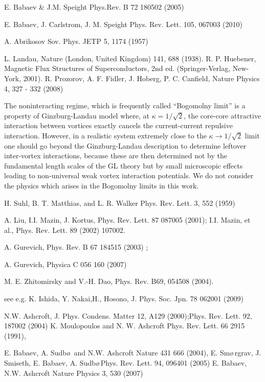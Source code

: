 
\begin{thebibliography}{99}
  \label{ch:Z}
 E. Babaev \& J.M. Speight Phys.Rev. B 72 180502 (2005)

 E. Babaev, J. Carlstrom, J. M. Speight Phys. Rev. Lett. 105, 067003 (2010)

 A. Abrikosov Sov. Phys. JETP 5, 1174 (1957)

 L. Landau, Nature (London, United Kingdom) 141, 688 (1938). R. P. Huebener, Magnetic Flux Structures of Superconductors, 2nd ed. (Springer-Verlag, New-York, 2001). R. Prozorov, A. F. Fidler, J. Hoberg, P. C. Canfield, Nature Physics 4, 327 - 332 (2008)

 The noninteracting regime, which is frequently called “Bogomolny limit” is a property of Ginzburg-Landau model where, at \( \kappa = 1/\sqrt{2} \), the core-core attractive interaction between vortices exactly cancels the current-current repulsive interaction. However, in a realistic system extremely close to the \( \kappa \to 1/\sqrt{2} \) limit one should go beyond the Ginzburg-Landau description to determine leftover inter-vortex interactions, because these are then determined not by the fundamental length scales of the GL theory but by small microscopic effects leading to non-universal weak vortex interaction potentials. We do not consider the physics which arises in the Bogomolny limits in this work.

 H. Suhl, B. T. Matthias, and L. R. Walker Phys. Rev. Lett. 3, 552 (1959)

 A. Liu, I.I. Mazin, J. Kortus, Phys. Rev. Lett. 87 087005 (2001); I.I. Mazin, et al., Phys. Rev. Lett. 89 (2002) 107002.

 A. Gurevich, Phys. Rev. B 67 184515 (2003) ;

 A. Gurevich, Physica C 056 160 (2007)

 M. E. Zhitomirsky and V.-H. Dao, Phys. Rev. B69, 054508 (2004).

 see e.g. K. Ishida, Y. Nakai,H., Hosono, J. Phys. Soc. Jpn. 78 062001 (2009)

 N.W. Ashcroft, J. Phys. Condens. Matter 12, A129 (2000);Phys. Rev. Lett. 92, 187002 (2004) K. Moulopoulos and N. W. Ashcroft Phys. Rev. Lett. 66 2915 (1991),

 E. Babaev, A. Sudb\o\,\! and N.W. Ashcroft Nature 431 666 (2004), E. Sm\o\,\!rgrav, J. Smiseth, E. Babaev, A. Sudb\o\,\!Phys. Rev. Lett. 94, 096401 (2005) E. Babaev, N.W. Ashcroft Nature Physics 3, 530 (2007)


\end{thebibliography}
